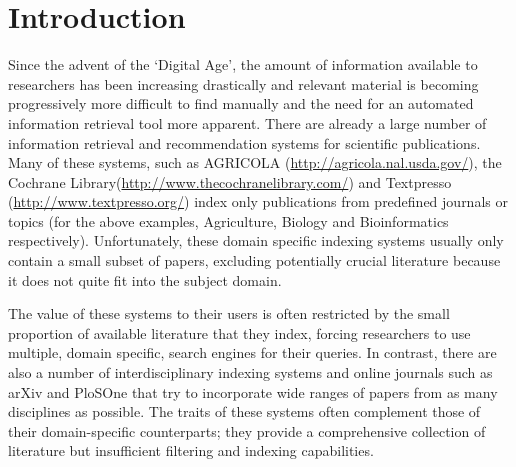 \documentclass{svmult}
\begin{document}
\vspace{-15pt}
\section{Introduction} \label{sec:1}


Since the advent of the `Digital Age', the amount of information available to
researchers has been increasing drastically and relevant material is becoming
progressively more difficult to find manually and the need for an automated
information retrieval tool more apparent. There are already a large number of
information retrieval and recommendation systems for scientific publications.
Many of these systems, such as AGRICOLA (\url{http://agricola.nal.usda.gov/}),
the Cochrane Library(\url{http://www.thecochranelibrary.com/}) and Textpresso
(\url{http://www.textpresso.org/}) index only publications from predefined
journals or topics (for the above examples, Agriculture, Biology and
Bioinformatics respectively).  Unfortunately, these domain specific indexing
systems usually only contain a small subset of papers, excluding potentially
crucial literature because it does not quite fit into the subject domain. 

The value of these systems to their users is often restricted by the small
proportion of available literature that they index, forcing researchers to use
multiple, domain specific, search engines for their queries.  In contrast,
there are also a number of interdisciplinary indexing systems and online
journals such as arXiv and 
PloSOne
that try to incorporate wide ranges of papers from as many disciplines as
possible. The traits of these systems often complement those of their
domain-specific counterparts; they provide a comprehensive collection of
literature but insufficient filtering and indexing capabilities.
\end{document}
